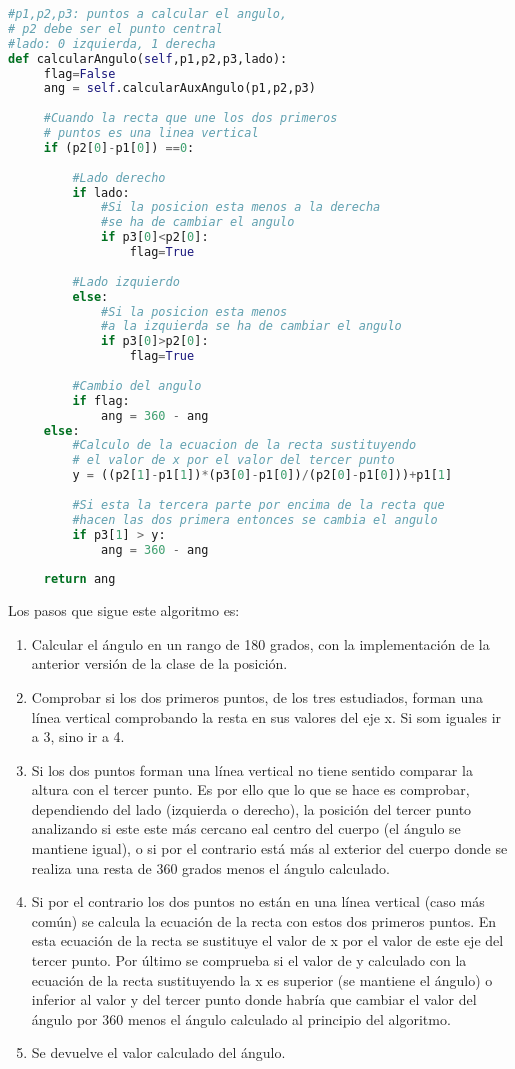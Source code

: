\begin{lstlisting}[language=Python]
#p1,p2,p3: puntos a calcular el angulo,
# p2 debe ser el punto central
#lado: 0 izquierda, 1 derecha
def calcularAngulo(self,p1,p2,p3,lado):
     flag=False
     ang = self.calcularAuxAngulo(p1,p2,p3)
     
     #Cuando la recta que une los dos primeros
     # puntos es una linea vertical
     if (p2[0]-p1[0]) ==0:
         
         #Lado derecho
         if lado:
             #Si la posicion esta menos a la derecha 
             #se ha de cambiar el angulo
             if p3[0]<p2[0]:
                 flag=True
         
         #Lado izquierdo
         else:
             #Si la posicion esta menos 
             #a la izquierda se ha de cambiar el angulo
             if p3[0]>p2[0]:
                 flag=True
         
         #Cambio del angulo
         if flag:
             ang = 360 - ang
     else:
         #Calculo de la ecuacion de la recta sustituyendo
         # el valor de x por el valor del tercer punto
         y = ((p2[1]-p1[1])*(p3[0]-p1[0])/(p2[0]-p1[0]))+p1[1]
         
         #Si esta la tercera parte por encima de la recta que 
         #hacen las dos primera entonces se cambia el angulo
         if p3[1] > y:
             ang = 360 - ang
     
     return ang
\end{lstlisting}

Los pasos que sigue este algoritmo es:
\begin{enumerate}
	\item Calcular el ángulo en un rango de 180 grados, con la implementación de la anterior versión de la clase de la posición.
	\item Comprobar si los dos primeros puntos, de los tres estudiados, forman una línea vertical comprobando la resta en sus valores del eje x. Si som iguales ir a 3, sino ir a 4.
	\item Si los dos puntos forman una línea vertical no tiene sentido comparar la altura con el tercer punto. Es por ello que lo que se hace es comprobar, dependiendo del lado (izquierda o derecho), la posición del tercer punto analizando si este este más cercano eal centro del cuerpo (el ángulo se mantiene igual), o si por el contrario está más al exterior del cuerpo donde se realiza una resta de 360 grados menos el ángulo calculado.
	\item Si por el contrario los dos puntos no están en una línea vertical (caso más común) se calcula la ecuación de la recta con estos dos primeros puntos. En esta ecuación de la recta se sustituye el valor de x por el valor de este eje del tercer punto. Por último se comprueba si el valor de y calculado con la ecuación de la recta sustituyendo la x es superior (se mantiene el ángulo) o inferior al valor y del tercer punto donde habría que cambiar el valor del ángulo por 360 menos el ángulo calculado al principio del algoritmo.
	\item Se devuelve el valor calculado del ángulo.
\end{enumerate}


